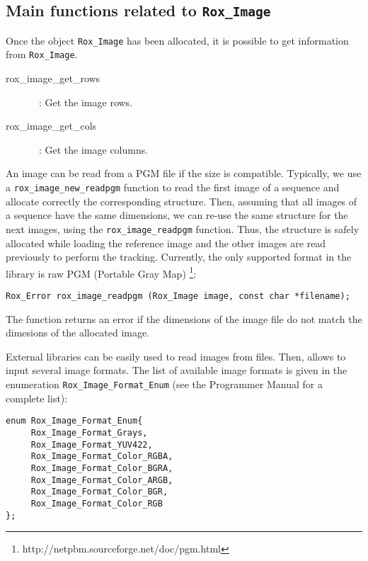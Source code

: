 \subsection{Main functions related to {\tt Rox\_Image}}
\label{sse:image_functs}

Once the object \lstinline$Rox_Image$ has been allocated, it is possible to get information from \lstinline$Rox_Image$.

\begin{description}
  \item [rox\_image\_get\_rows]~: Get the image rows.
  \item [rox\_image\_get\_cols]~: Get the image columns.
\end{description}

An image can be read from a PGM file if the size is compatible.
Typically, we use a \lstinline$rox_image_new_readpgm$ function to
read the first image of a sequence and allocate correctly the
corresponding structure. Then, assuming that all images of a sequence
have the same dimensions, we can re-use the same structure for the
next images, using the \lstinline$rox_image_readpgm$ function. Thus,
the structure is safely allocated while loading the reference image
and the other images are read previously to perform the tracking.
Currently, the only supported format in the library is raw PGM
(Portable Gray Map) \footnote{{http://netpbm.sourceforge.net/doc/pgm.html}}:
\begin{lstlisting}
Rox_Error rox_image_readpgm (Rox_Image image, const char *filename);
\end{lstlisting}
The function returns an error if the dimensions of the image file do not match the dimesions of the allocated image.

External libraries can be easily used to read images from files. Then,
\rox{} allows to input several image formats. The list of
available image formats is given in the enumeration
\lstinline$Rox_Image_Format_Enum$ (see the Programmer Manual for a
complete list):

\begin{lstlisting}
enum Rox_Image_Format_Enum{
     Rox_Image_Format_Grays,
     Rox_Image_Format_YUV422,
     Rox_Image_Format_Color_RGBA,
     Rox_Image_Format_Color_BGRA,
     Rox_Image_Format_Color_ARGB,
     Rox_Image_Format_Color_BGR,
     Rox_Image_Format_Color_RGB
};
\end{lstlisting}

